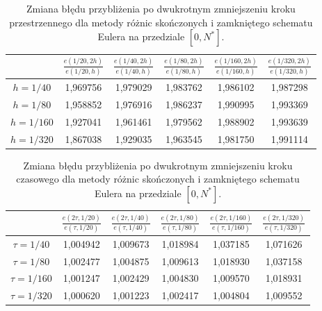\documentclass{article}
\begin{document}
		\begin{table}[h!]
			\caption{Zmiana błędu przybliżenia po dwukrotnym zmniejszeniu kroku przestrzennego dla metody różnic skończonych i zamkniętego schematu Eulera na przedziale $[0,N^{*}]$.}
			\centering
			\begin{tabular}{|c|c|c|c|c|c|}
				\hline
				& $\frac{e(1/20,2h)}{e(1/20,h)}$ &  $\frac{e(1/40,2h)}{e(1/40,h)}$ &  $\frac{e(1/80,2h)}{e(1/80,h)}$ &  $\frac{e(1/160,2h)}{e(1/160,h)}$ &  $\frac{e(1/320,2h)}{e(1/320,h)}$ \\
				\hline
				$h=1/40$  &  1,969756 &	1,979029 &	1,983762 &	1,986102 &	1,987298 \\
				\hline
				$h=1/80$  &1,958852 &	1,976916 &	1,986237 &	1,990995 &	1,993369 \\
				\hline
				$h=1/160$ &1,927041 &	1,961461 &	1,979562 &	1,988902 &	1,993639 \\
				\hline
				$h=1/320$ & 1,867038 &	1,929035 &	1,963545 &	1,981750 &	1,991114 \\
				\hline
			\end{tabular}
		\end{table}
		\begin{table}[h!]
			\caption{Zmiana błędu przybliżenia po dwukrotnym zmniejszeniu kroku czasowego dla metody różnic skończonych i zamkniętego schematu Eulera na przedziale $[0,N^{*}]$.}
			\centering
			\begin{tabular}{|c|c|c|c|c|c|}
				\hline
				& $\frac{{e}(2\tau,1/20)}{e(\tau,1/20)}$ &  $\frac{e(2\tau,1/40)}{e(\tau,1/40)}$ &  $\frac{e(2\tau,1/80)}{e(\tau,1/80)}$ &  $\frac{e(2\tau,1/160)}{e(\tau,1/160)}$ &  $\frac{e(2\tau,1/320)}{e(\tau,1/320)}$ \\
				\hline
				$\tau=1/40$ & 1,004942 	&1,009673 &	1,018984 &	1,037185 &	1,071626 \\
				\hline
				$\tau=1/80$  &1,002477 	&1,004875 &	1,009613 &	1,018930 &	1,037158 \\
				\hline
				$\tau=1/160$ & 1,001247 &	1,002429 &	1,004830 &	1,009570 &	1,018931 \\
				\hline
				$\tau=1/320$ & 1,000620 &	1,001223 &	1,002417 &	1,004804 &	1,009552 \\
				\hline
			\end{tabular}
		\end{table}
		
		
\end{document}
